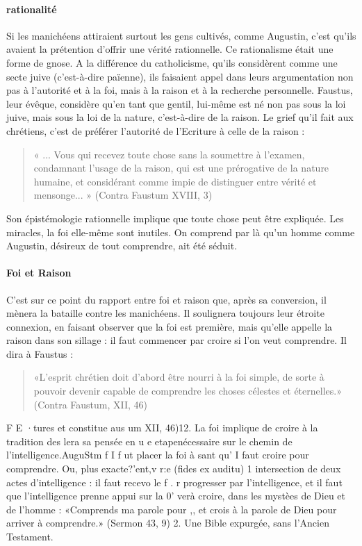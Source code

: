 \paragraph{rationalité}	Si les manichéens attiraient surtout les gens cultivés, comme Augustin, c'est qu'ils avaient la prétention d'offrir une vérité rationnelle. Ce rationalisme était une forme de gnose. A la différence du catholicisme, qu'ils considèrent comme une secte juive (c'est-à-dire païenne), ils faisaient appel dans leurs argumentation non pas à l'autorité et à la foi, mais à la raison et à la recherche personnelle. Faustus, leur évêque, considère qu'en tant que gentil, lui-même est né non pas sous la loi juive, mais sous la loi de la nature, c'est-à-dire de la raison. Le grief qu'il fait aux chrétiens, c'est de préférer l'autorité de l'Ecriture à celle de la raison : 
\begin{quote}
  « ... Vous qui recevez toute chose sans la soumettre à l'examen, condamnant l'usage de la raison, qui	est une prérogative de la nature humaine, et considérant comme impie de distinguer entre vérité et mensonge... » (Contra Faustum XVIII, 3)   
\end{quote}
Son épistémologie rationnelle
implique que toute chose peut être expliquée. Les miracles, la foi elle-même sont inutiles. On comprend par là qu'un homme comme Augustin, désireux de tout comprendre, ait été séduit.

\paragraph{Foi et Raison}	C'est sur ce point du rapport  entre  foi  et  raison que, après sa conversion, il mènera la bataille contre les manichéens. Il soulignera toujours leur étroite connexion, en faisant observer que la foi est première, mais qu'elle appelle la raison dans son sillage : il faut commencer par croire si l'on veut comprendre. Il dira à Faustus :  

\begin{quote}
    «L'esprit chrétien doit d'abord être nourri à la foi simple, de sorte à pouvoir devenir capable de comprendre les choses célestes et éternelles.» (Contra Faustum, XII, 46) \sn{}
\end{quote}


 
F	E	·tures et constitue
aus um XII, 46)12. La foi implique de croire à la tradition des  lera sa pensée en u e etapenécessaire sur le chemin de l'intelligence.AuguStm f I f	ut	placer la foi à sant qu' I faut croire pour comprendre. Ou, plus exacte?'ent,v r:e (fides ex auditu)
1 intersection de deux actes d'intelligence : il faut recevo  le	f	.	r	progresser
par l'intelligence, et il faut que l'intelligence prenne appui sur la 0'	verà croire, dans les mystèes de Dieu et de l'homme : «Comprends ma parole pour	,,
et crois à la parole de Dieu pour arriver à comprendre.» (Sermon 43, 9)
2.	Une Bible expurgée, sans l'Ancien Testament.

